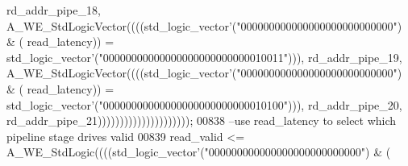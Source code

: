 \begin{DoxyCode}
{      rd_addr_pipe_18}\textcolor{vhdlchar}{,} \textcolor{vhdlchar}{A\_WE\_StdLogicVector}\textcolor{vhdlchar}{(}\textcolor{vhdlchar}{(}\textcolor{vhdlchar}{(}\textcolor{vhdlchar}{(}\textcolor{comment}{std\_logic\_vector}\textcolor{vhdlchar}{'}\textcolor{vhdlchar}{(}\textcolor{vhdllogic}{"000000000000000000000000000"}\textcolor{vhdlchar}{)} \textcolor{vhdlchar}{&} \textcolor{vhdlchar}{(}\textcolor{vhdlchar}{
      read_latency}\textcolor{vhdlchar}{)}\textcolor{vhdlchar}{)} \textcolor{vhdlchar}{=} \textcolor{comment}{std\_logic\_vector}\textcolor{vhdlchar}{'}\textcolor{vhdlchar}{(}\textcolor{vhdllogic}{"00000000000000000000000000010011"}\textcolor{vhdlchar}{)}\textcolor{vhdlchar}{)}\textcolor{vhdlchar}{)}\textcolor{vhdlchar}{,} \textcolor{vhdlchar}{
      rd_addr_pipe_19}\textcolor{vhdlchar}{,} \textcolor{vhdlchar}{A\_WE\_StdLogicVector}\textcolor{vhdlchar}{(}\textcolor{vhdlchar}{(}\textcolor{vhdlchar}{(}\textcolor{vhdlchar}{(}\textcolor{comment}{std\_logic\_vector}\textcolor{vhdlchar}{'}\textcolor{vhdlchar}{(}\textcolor{vhdllogic}{"000000000000000000000000000"}\textcolor{vhdlchar}{)} \textcolor{vhdlchar}{&} \textcolor{vhdlchar}{(}\textcolor{vhdlchar}{
      read_latency}\textcolor{vhdlchar}{)}\textcolor{vhdlchar}{)} \textcolor{vhdlchar}{=} \textcolor{comment}{std\_logic\_vector}\textcolor{vhdlchar}{'}\textcolor{vhdlchar}{(}\textcolor{vhdllogic}{"00000000000000000000000000010100"}\textcolor{vhdlchar}{)}\textcolor{vhdlchar}{)}\textcolor{vhdlchar}{)}\textcolor{vhdlchar}{,} \textcolor{vhdlchar}{
      rd_addr_pipe_20}\textcolor{vhdlchar}{,} \textcolor{vhdlchar}{rd_addr_pipe_21}\textcolor{vhdlchar}{)}\textcolor{vhdlchar}{)}\textcolor{vhdlchar}{)}\textcolor{vhdlchar}{)}\textcolor{vhdlchar}{)}\textcolor{vhdlchar}{)}\textcolor{vhdlchar}{)}\textcolor{vhdlchar}{)}\textcolor{vhdlchar}{)}\textcolor{vhdlchar}{)}\textcolor{vhdlchar}{)}\textcolor{vhdlchar}{)}\textcolor{vhdlchar}{)}\textcolor{vhdlchar}{)}\textcolor{vhdlchar}{)}\textcolor{vhdlchar}{)}\textcolor{vhdlchar}{)}\textcolor{vhdlchar}{)}\textcolor{vhdlchar}{)}\textcolor{vhdlchar}{)}\textcolor{vhdlchar}{)};
00838 \textcolor{keyword}{  --use read\_latency to select which pipeline stage drives valid}
00839   \textcolor{vhdlchar}{read_valid} \textcolor{vhdlchar}{<=} \textcolor{vhdlchar}{A\_WE\_StdLogic}\textcolor{vhdlchar}{(}\textcolor{vhdlchar}{(}\textcolor{vhdlchar}{(}\textcolor{vhdlchar}{(}\textcolor{comment}{std\_logic\_vector}\textcolor{vhdlchar}{'}\textcolor{vhdlchar}{(}\textcolor{vhdllogic}{"000000000000000000000000000"}\textcolor{vhdlchar}{)} \textcolor{vhdlchar}{&} \textcolor{vhdlchar}{(}\textcolor{vhdlchar}{
}
\end{DoxyCode}
